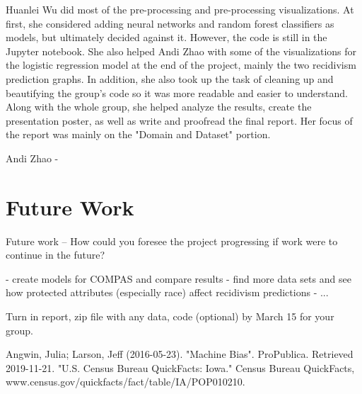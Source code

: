 \documentclass[11pt, sigconf]{acmart}
\begin{document}
Huanlei Wu did most of the pre-processing and pre-processing visualizations. At first, she considered adding neural networks and random forest classifiers as models, but ultimately decided against it. However, the code is still in the Jupyter notebook. She also helped Andi Zhao with some of the visualizations for the logistic regression model at the end of the project, mainly the two recidivism prediction graphs. In addition, she also took up the task of cleaning up and beautifying the group's code so it was more readable and easier to understand. Along with the whole group, she helped analyze the results, create the presentation poster, as well as write and proofread the final report. Her focus of the report was mainly on the "Domain and Dataset" portion. 

Andi Zhao - 


\section{Future Work}
Future work – How could you foresee the project progressing if work were to continue in the
future?

- create models for COMPAS and compare results
- find more data sets and see how protected attributes (especially race) affect recidivism predictions
- ...

Turn in report, zip file with any data, code (optional) by March 15 for your group.

\begin{thebibliography}{2}

Angwin, Julia; Larson, Jeff (2016-05-23). "Machine Bias". ProPublica. Retrieved 2019-11-21.
"U.S. Census Bureau QuickFacts: Iowa." Census Bureau QuickFacts, www.census.gov/quickfacts/fact/table/IA/POP010210.

\end{thebibliography}
\end{document}
